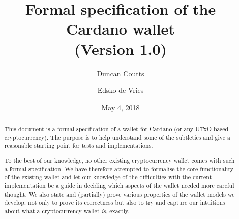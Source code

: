 \documentclass{article}
\numberwithin{equation}{lemma}
\begin{document}
\title{Formal specification of the Cardano wallet \\ \small{(Version 1.0)}}
\author{Duncan Coutts \and Edsko de Vries}
\date{May 4, 2018}

\maketitle

\begin{abstract}
This document is a formal specification of a wallet for Cardano (or any
UTxO-based cryptocurrency). The purpose is to help understand some of the
subtleties and give a reasonable starting point for tests and implementations.

To the best of our knowledge, no other existing cryptocurrency wallet comes with
such a formal specification. We have therefore attempted to formalise the core
functionality of the existing wallet and let our knowledge of the difficulties
with the current implementation be a guide in deciding which aspects of the
wallet needed more careful thought. We also state and (partially) prove various
properties of the wallet models we develop, not only to prove its correctness
but also to try and capture our intuitions about what a cryptocurrency wallet
\emph{is}, exactly.
\end{abstract}

\tableofcontents
\listoffigures
\end{document}
